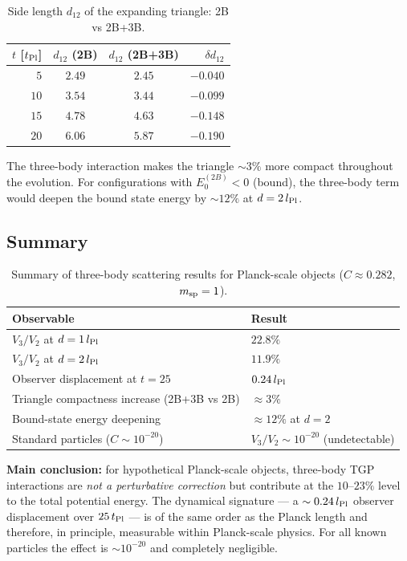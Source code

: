 \begin{table}[h]
\centering
\caption{Side length $d_{12}$ of the expanding triangle: 2B vs 2B+3B.}
\label{tab:triangle_stability}
\begin{tabular}{rccr}
\hline
$t$ [$t_{\rm Pl}$] & $d_{12}$ (2B) & $d_{12}$ (2B+3B) & $\delta d_{12}$ \\
\hline
$ 5$  & $2.49$ & $2.45$ & $-0.040$ \\
$10$  & $3.54$ & $3.44$ & $-0.099$ \\
$15$  & $4.78$ & $4.63$ & $-0.148$ \\
$20$  & $6.06$ & $5.87$ & $-0.190$ \\
\hline
\end{tabular}
\end{table}

\noindent
The three-body interaction makes the triangle $\sim3\%$ more compact
throughout the evolution.  For configurations with $E_0^{(2B)}<0$ (bound),
the three-body term would deepen the bound state energy by $\sim12\%$ at
$d=2\,l_{\rm Pl}$.

\subsection{Summary}

\begin{table}[h]
\centering
\caption{Summary of three-body scattering results for Planck-scale objects
($C\approx0.282$, $m_{\rm sp}=1$).}
\label{tab:scattering_summary}
\begin{tabular}{ll}
\hline
Observable & Result \\
\hline
$V_3/V_2$ at $d=1\,l_{\rm Pl}$   & $22.8\%$ \\
$V_3/V_2$ at $d=2\,l_{\rm Pl}$   & $11.9\%$ \\
Observer displacement at $t=25$    & $0.24\,l_{\rm Pl}$ \\
Triangle compactness increase (2B+3B vs 2B) & $\approx3\%$ \\
Bound-state energy deepening       & $\approx12\%$ at $d=2$ \\
Standard particles ($C\sim10^{-20}$) & $V_3/V_2\sim10^{-20}$ (undetectable) \\
\hline
\end{tabular}
\end{table}

\noindent
\textbf{Main conclusion:} for hypothetical Planck-scale objects,
three-body TGP interactions are \emph{not a perturbative correction}
but contribute at the $10$--$23\%$ level to the total potential energy.
The dynamical signature — a $\sim0.24\,l_{\rm Pl}$ observer displacement
over $25\,t_{\rm Pl}$ — is of the same order as the Planck length and
therefore, in principle, measurable within Planck-scale physics.
For all known particles the effect is $\sim10^{-20}$ and completely negligible.
